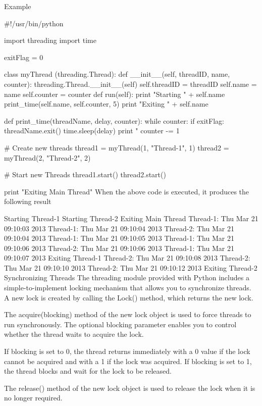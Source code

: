 Example

#!/usr/bin/python

import threading
import time

exitFlag = 0

class myThread (threading.Thread):
    def __init__(self, threadID, name, counter):
        threading.Thread.__init__(self)
        self.threadID = threadID
        self.name = name
        self.counter = counter
    def run(self):
        print "Starting " + self.name
        print_time(self.name, self.counter, 5)
        print "Exiting " + self.name

def print_time(threadName, delay, counter):
    while counter:
        if exitFlag:
            threadName.exit()
        time.sleep(delay)
        print "%
        counter -= 1

# Create new threads
thread1 = myThread(1, "Thread-1", 1)
thread2 = myThread(2, "Thread-2", 2)

# Start new Threads
thread1.start()
thread2.start()

print "Exiting Main Thread"
When the above code is executed, it produces the following result

Starting Thread-1
Starting Thread-2
Exiting Main Thread
Thread-1: Thu Mar 21 09:10:03 2013
Thread-1: Thu Mar 21 09:10:04 2013
Thread-2: Thu Mar 21 09:10:04 2013
Thread-1: Thu Mar 21 09:10:05 2013
Thread-1: Thu Mar 21 09:10:06 2013
Thread-2: Thu Mar 21 09:10:06 2013
Thread-1: Thu Mar 21 09:10:07 2013
Exiting Thread-1
Thread-2: Thu Mar 21 09:10:08 2013
Thread-2: Thu Mar 21 09:10:10 2013
Thread-2: Thu Mar 21 09:10:12 2013
Exiting Thread-2
Synchronizing Threads
The threading module provided with Python includes a simple-to-implement locking mechanism that allows you to synchronize threads. A new lock is created by calling the Lock() method, which returns the new lock.

The acquire(blocking) method of the new lock object is used to force threads to run synchronously. The optional blocking parameter enables you to control whether the thread waits to acquire the lock.

If blocking is set to 0, the thread returns immediately with a 0 value if the lock cannot be acquired and with a 1 if the lock was acquired. If blocking is set to 1, the thread blocks and wait for the lock to be released.

The release() method of the new lock object is used to release the lock when it is no longer required.

